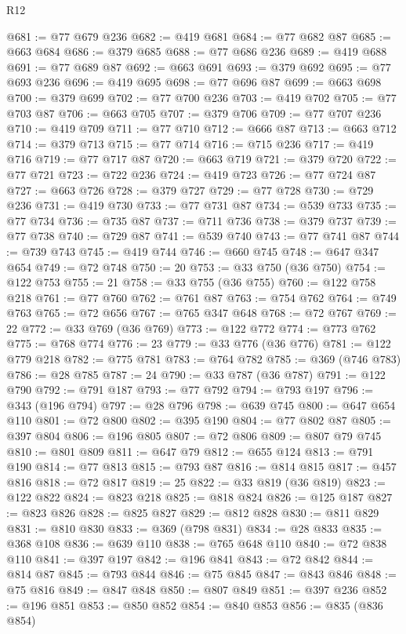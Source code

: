 \begin{lexlean}{R12}
\begin{coremodule}
@681 := @77 @679 @236
@682 := @419 @681
@684 := @77 @682 @87
@685 := @663 @684
@686 := @379 @685
@688 := @77 @686 @236
@689 := @419 @688
@691 := @77 @689 @87
@692 := @663 @691
@693 := @379 @692
@695 := @77 @693 @236
@696 := @419 @695
@698 := @77 @696 @87
@699 := @663 @698
@700 := @379 @699
@702 := @77 @700 @236
@703 := @419 @702
@705 := @77 @703 @87
@706 := @663 @705
@707 := @379 @706
@709 := @77 @707 @236
@710 := @419 @709
@711 := @77 @710
@712 := @666 @87
@713 := @663 @712
@714 := @379 @713
@715 := @77 @714
@716 := @715 @236
@717 := @419 @716
@719 := @77 @717 @87
@720 := @663 @719
@721 := @379 @720
@722 := @77 @721
@723 := @722 @236
@724 := @419 @723
@726 := @77 @724 @87
@727 := @663 @726
@728 := @379 @727
@729 := @77 @728
@730 := @729 @236
@731 := @419 @730
@733 := @77 @731 @87
@734 := @539 @733
@735 := @77 @734
@736 := @735 @87
@737 := @711 @736
@738 := @379 @737
@739 := @77 @738
@740 := @729 @87
@741 := @539 @740
@743 := @77 @741 @87
@744 := @739 @743
@745 := @419 @744
@746 := @660 @745
@748 := @647 @347 @654
@749 := @72 @748
@750 := 20
@753 := @33 @750 (@36 @750)
@754 := @122 @753
@755 := 21
@758 := @33 @755 (@36 @755)
@760 := @122 @758 @218
@761 := @77 @760
@762 := @761 @87
@763 := @754 @762
@764 := @749 @763
@765 := @72 @656
@767 := @765 @347 @648
@768 := @72 @767
@769 := 22
@772 := @33 @769 (@36 @769)
@773 := @122 @772
@774 := @773 @762
@775 := @768 @774
@776 := 23
@779 := @33 @776 (@36 @776)
@781 := @122 @779 @218
@782 := @775 @781
@783 := @764 @782
@785 := @369 (@746 @783)
@786 := @28 @785
@787 := 24
@790 := @33 @787 (@36 @787)
@791 := @122 @790
@792 := @791 @187
@793 := @77 @792
@794 := @793 @197
@796 := @343 (@196 @794)
@797 := @28 @796
@798 := @639 @745
@800 := @647 @654 @110
@801 := @72 @800
@802 := @395 @190
@804 := @77 @802 @87
@805 := @397 @804
@806 := @196 @805
@807 := @72 @806
@809 := @807 @79 @745
@810 := @801 @809
@811 := @647 @79
@812 := @655 @124
@813 := @791 @190
@814 := @77 @813
@815 := @793 @87
@816 := @814 @815
@817 := @457 @816
@818 := @72 @817
@819 := 25
@822 := @33 @819 (@36 @819)
@823 := @122 @822
@824 := @823 @218
@825 := @818 @824
@826 := @125 @187
@827 := @823 @826
@828 := @825 @827
@829 := @812 @828
@830 := @811 @829
@831 := @810 @830
@833 := @369 (@798 @831)
@834 := @28 @833
@835 := @368 @108
@836 := @639 @110
@838 := @765 @648 @110
@840 := @72 @838 @110
@841 := @397 @197
@842 := @196 @841
@843 := @72 @842
@844 := @814 @87
@845 := @793 @844
@846 := @75 @845
@847 := @843 @846
@848 := @75 @816
@849 := @847 @848
@850 := @807 @849
@851 := @397 @236
@852 := @196 @851
@853 := @850 @852
@854 := @840 @853
@856 := @835 (@836 @854)

\end{coremodule}
\end{lexlean}
